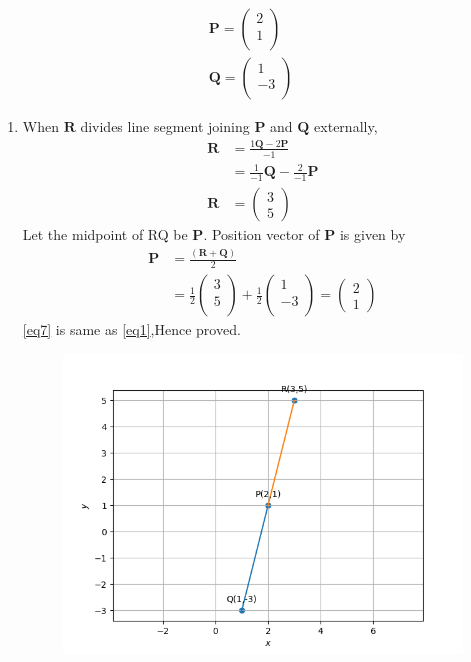 \documentclass[10pt]{article}
\newcommand{\myvec}[1]{\ensuremath{\begin{pmatrix}#1\end{pmatrix}}}
\let\vec\mathbf{}
\begin{document}
\begin{align}
\vec{P} = \myvec{ 2\\1\\} 
 \label{eq1} \\
 \vec{Q} = \myvec{ 1\\-3\\}
\end{align}
\begin{enumerate}
\item When $\vec{R}$ divides line segment joining $\vec{P}$ and $\vec{Q}$ externally,
\begin{align}
\vec{R} &= \frac{1\vec{Q} -2\vec{P}}{-1} \\
 &= \frac{1}{-1} \vec{Q} -\frac{2}{-1} \vec{P}\\
\vec{R} &= \myvec{3\\5}
\end{align}
Let the midpoint of RQ  be $\vec{P}$.
Position vector of $\vec{P}$ is given by
\begin{align}
 \vec{P} &= \frac{ (\vec{R} + \vec{Q})}{2}\\
&=\frac{1}{2}\myvec{3\\5\\} +  \frac{1}{2}\myvec{1\\-3\\} =\myvec{2\\1} 
 \label{eq7}
\end{align}
\eqref{eq7} is same as \eqref{eq1},Hence proved.
\begin{figure}[!h]
	\begin{center}
		\includegraphics[width=\columnwidth]{./figs/line.png}
	\end{center}
\caption{}
\label{Figure1}
\end{figure}
\end{enumerate}
\end{document}
